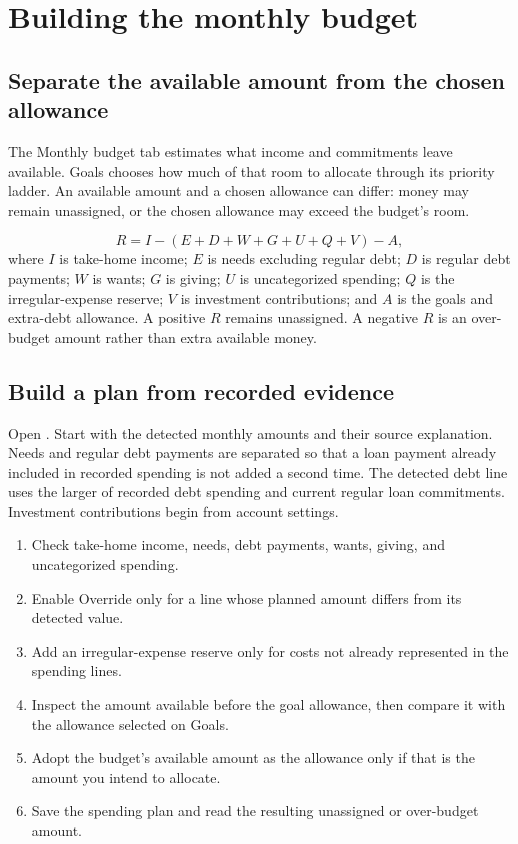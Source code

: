 \chapter{Building the monthly budget}\label{ch:budget}
\section{Separate the available amount from the chosen allowance}
The Monthly budget tab estimates what income and commitments leave available. Goals chooses how much of that room to allocate through its priority ladder. An available amount and a chosen allowance can differ: money may remain unassigned, or the chosen allowance may exceed the budget's room.

\begin{equation}\label{eq:budget}
 R=I-(E+D+W+G+U+Q+V)-A,
\end{equation}
where \(I\) is take-home income; \(E\) is needs excluding regular debt; \(D\) is regular debt payments; \(W\) is wants; \(G\) is giving; \(U\) is uncategorized spending; \(Q\) is the irregular-expense reserve; \(V\) is investment contributions; and \(A\) is the goals and extra-debt allowance. A positive \(R\) remains unassigned. A negative \(R\) is an over-budget amount rather than extra available money.

\section{Build a plan from recorded evidence}
Open . Start with the detected monthly amounts and their source explanation. Needs and regular debt payments are separated so that a loan payment already included in recorded spending is not added a second time. The detected debt line uses the larger of recorded debt spending and current regular loan commitments. Investment contributions begin from account settings.

\begin{enumerate}
\item Check take-home income, needs, debt payments, wants, giving, and uncategorized spending.
\item Enable Override only for a line whose planned amount differs from its detected value.
\item Add an irregular-expense reserve only for costs not already represented in the spending lines.
\item Inspect the amount available before the goal allowance, then compare it with the allowance selected on Goals.
\item Adopt the budget's available amount as the allowance only if that is the amount you intend to allocate.
\item Save the spending plan and read the resulting unassigned or over-budget amount.
\end{enumerate}

